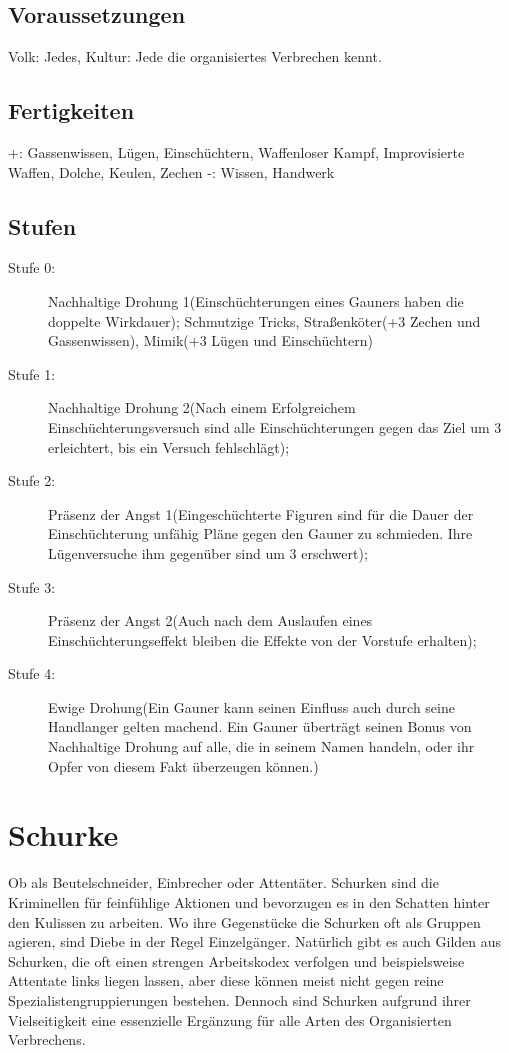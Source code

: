 \documentclass[a4paper,12pt,oneside]{book}
\begin{document}
\subsection{Voraussetzungen}
Volk: Jedes, Kultur: Jede die organisiertes Verbrechen kennt.
\subsection{Fertigkeiten}
+: Gassenwissen, Lügen, Einschüchtern, Waffenloser Kampf, Improvisierte Waffen, Dolche, Keulen, Zechen
-: Wissen, Handwerk
\subsection{Stufen}
\begin{description}
\item[Stufe 0:] Nachhaltige Drohung 1(Einschüchterungen eines Gauners haben die doppelte Wirkdauer); Schmutzige Tricks, Straßenköter(+3 Zechen und Gassenwissen), Mimik(+3 Lügen und Einschüchtern) 
\item[Stufe 1:] Nachhaltige Drohung 2(Nach einem Erfolgreichem Einschüchterungsversuch sind alle Einschüchterungen gegen das Ziel um 3 erleichtert, bis ein Versuch fehlschlägt);
\item[Stufe 2:] Präsenz der Angst 1(Eingeschüchterte Figuren sind für die Dauer der Einschüchterung unfähig Pläne gegen den Gauner zu schmieden. Ihre Lügenversuche ihm gegenüber sind um 3 erschwert);
\item[Stufe 3:] Präsenz der Angst 2(Auch nach dem Auslaufen eines Einschüchterungseffekt bleiben die Effekte von der Vorstufe erhalten);
\item[Stufe 4:] Ewige Drohung(Ein Gauner kann seinen Einfluss auch durch seine Handlanger gelten machend. Ein Gauner überträgt seinen Bonus von Nachhaltige Drohung auf alle, die in seinem Namen handeln, oder ihr Opfer von diesem Fakt überzeugen können.)
\end{description}
\section{Schurke}
Ob als Beutelschneider, Einbrecher oder Attentäter. Schurken sind die Kriminellen für feinfühlige Aktionen und bevorzugen es in den Schatten hinter den Kulissen zu arbeiten. Wo ihre Gegenstücke die Schurken oft als Gruppen agieren, sind Diebe in der Regel Einzelgänger. Natürlich gibt es auch Gilden aus Schurken, die oft einen strengen Arbeitskodex verfolgen und beispielsweise Attentate links liegen lassen, aber diese können meist nicht gegen reine Spezialistengruppierungen bestehen. Dennoch sind Schurken aufgrund ihrer Vielseitigkeit eine essenzielle Ergänzung für alle Arten des Organisierten Verbrechens.
\end{document}
